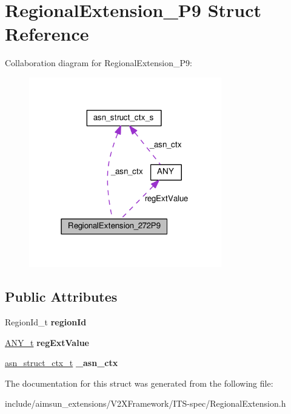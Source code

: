 \hypertarget{structRegionalExtension__272P9}{}\section{Regional\+Extension\+\_\+P9 Struct Reference}
\label{structRegionalExtension__272P9}


Collaboration diagram for Regional\+Extension\+\_\+P9\+:\nopagebreak
\begin{figure}[H]
\begin{center}
\leavevmode
\includegraphics[width=238pt]{structRegionalExtension__272P9__coll__graph}
\end{center}
\end{figure}
\subsection*{Public Attributes}
\begin{DoxyCompactItemize}
\item 
Region\+Id\+\_\+t {\bfseries region\+Id}\hypertarget{structRegionalExtension__272P9_accd43efe40c9e1dd6e5fcc0ca29c789d}{}\label{structRegionalExtension__272P9_accd43efe40c9e1dd6e5fcc0ca29c789d}

\item 
\hyperlink{structANY}{A\+N\+Y\+\_\+t} {\bfseries reg\+Ext\+Value}\hypertarget{structRegionalExtension__272P9_a6f6b16bd0c70f63bfe0860f9b203ecb4}{}\label{structRegionalExtension__272P9_a6f6b16bd0c70f63bfe0860f9b203ecb4}

\item 
\hyperlink{structasn__struct__ctx__s}{asn\+\_\+struct\+\_\+ctx\+\_\+t} {\bfseries \+\_\+asn\+\_\+ctx}\hypertarget{structRegionalExtension__272P9_aebc0f146d10dc24d364777105ab6799a}{}\label{structRegionalExtension__272P9_aebc0f146d10dc24d364777105ab6799a}

\end{DoxyCompactItemize}


The documentation for this struct was generated from the following file\+:\begin{DoxyCompactItemize}
\item 
include/aimsun\+\_\+extensions/\+V2\+X\+Framework/\+I\+T\+S-\/spec/Regional\+Extension.\+h\end{DoxyCompactItemize}

